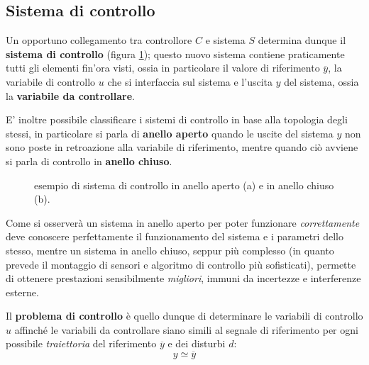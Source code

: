    \subsection{Sistema di controllo} \label{sec:sistemacontrollo}
        \begin{concetto}
            Un opportuno collegamento tra controllore $C$ e sistema $S$ determina dunque il \textbf{sistema di controllo} (figura \ref{fig:sis:anelli}); questo nuovo sistema contiene praticamente tutti gli elementi fin'ora visti, ossia in particolare il valore di riferimento $\overline y$, la variabile di controllo $u$ che si interfaccia sul sistema e l'uscita $y$ del sistema, ossia la \textbf{variabile da controllare}.
            
            E' inoltre possibile classificare i sistemi di controllo in base alla topologia degli stessi, in particolare si parla di \textbf{anello aperto} quando le uscite del sistema $y$ non sono poste in retroazione alla variabile di riferimento, mentre quando ciò avviene si parla di controllo in \textbf{anello chiuso}.
        \end{concetto}
        
        \begin{figure}[bht]
        	\centering 
        	\begin{subfigure}{0.48\linewidth}
        		\centering
        		 \caption{}
        	\end{subfigure}
	        \begin{subfigure}{0.48\linewidth}
		        \centering
		         \caption{}
		    \end{subfigure}
	    	\caption{esempio di sistema di controllo in anello aperto (a) e in anello chiuso (b).}
	    	\label{fig:sis:anelli}
        \end{figure}
            	
        Come si osserverà un sistema in anello aperto per poter funzionare \textit{correttamente} deve conoscere perfettamente il funzionamento del sistema e i parametri dello stesso, mentre un sistema in anello chiuso, seppur più complesso (in quanto prevede il montaggio di sensori e algoritmo di controllo più sofisticati), permette di ottenere prestazioni sensibilmente \textit{migliori}, immuni da incertezze e interferenze esterne.
    	
    	\begin{concetto}
    		Il \textbf{problema di controllo} è quello dunque di determinare le variabili di controllo $u$ affinché le variabili da controllare siano simili al segnale di riferimento per ogni possibile \textit{traiettoria} del riferimento $\overline y$ e dei disturbi $d$:
    		\[ y\simeq \overline y \]
    	\end{concetto}
    
